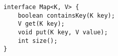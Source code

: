 \begin{lstlisting}
interface Map<K, V> {
    boolean containsKey(K key);
    V get(K key);
    void put(K key, V value);
    int size();
}
\end{lstlisting}
